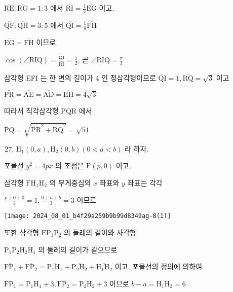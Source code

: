 \documentclass[10pt]{article}
\begin{document}
$\overline{\mathrm{RE}}: \overline{\mathrm{RG}}=1: 3$ 에서 $\overline{\mathrm{RI}}=\frac{1}{4} \overline{\mathrm{EG}}$ 이고,

$\overline{\mathrm{QF}}: \overline{\mathrm{QH}}=3: 5$ 에서 $\overline{\mathrm{QI}}=\frac{1}{8} \overline{\mathrm{FH}}$

$\overline{\mathrm{EG}}=\overline{\mathrm{FH}}$ 이므로

$\cos (\angle \mathrm{RIQ})=\frac{\overline{\mathrm{QI}}}{\overline{\mathrm{RI}}}=\frac{1}{2}$, 곧 $\angle \mathrm{RIQ}=\frac{\pi}{3}$

삼각형 EFI 는 한 변의 길이가 4 인 정삼각형이므로 $\overline{\mathrm{QI}}=1, \overline{\mathrm{RQ}}=\sqrt{3}$ 이고

$\overline{\mathrm{PR}}=\overline{\mathrm{AE}}=\overline{\mathrm{AD}}=\overline{\mathrm{EH}}=4 \sqrt{3}$

따라서 직각삼각형 PQR 에서

$\overline{\mathrm{PQ}}=\sqrt{\overline{\mathrm{PR}}^{2}+\overline{\mathrm{RQ}}^{2}}=\sqrt{51}$

\begin{enumerate}
  \setcounter{enumi}{26}
  \item $\mathrm{H}_{1}(0, a), \mathrm{H}_{2}(0, b)(0<a<b)$ 라 하자.
\end{enumerate}

포물선 $y^{2}=4 p x$ 의 초점은 $\mathrm{F}(p, 0)$ 이고,

삼각형 $\mathrm{FH}_{1} \mathrm{H}_{2}$ 의 무게중심의 $x$ 좌표와 $y$ 좌표는 각각

$\frac{p+0+0}{3}=1, \frac{0+a+b}{3}=3$ 이므로

\begin{center}
\texttt{[image: 2024\_08\_01\_b4f29a259b9b99d8349ag-8(1)]}
\end{center}

또한 삼각형 $\mathrm{FP}_{1} \mathrm{P}_{2}$ 의 둘레의 길이와 사각형

$\mathrm{P}_{1} \mathrm{P}_{2} \mathrm{H}_{2} \mathrm{H}_{1}$ 의 둘레의 길이가 같으므로

$\overline{\mathrm{FP}_{1}}+\overline{\mathrm{FP}_{2}}=\overline{\mathrm{P}_{1} \mathrm{H}_{1}}+\overline{\mathrm{P}_{2} \mathrm{H}_{2}}+\overline{\mathrm{H}_{1} \mathrm{H}_{2}}$ 이고, 포물선의 정의에 의하여

$\overline{\mathrm{FP}_{1}}=\overline{\mathrm{P}_{1} \mathrm{H}_{1}}+3, \overline{\mathrm{FP}_{2}}=\overline{\mathrm{P}_{2} \mathrm{H}_{2}}+3$ 이므로 $b-a=\overline{\mathrm{H}_{1} \mathrm{H}_{2}}=6$
\end{document}
